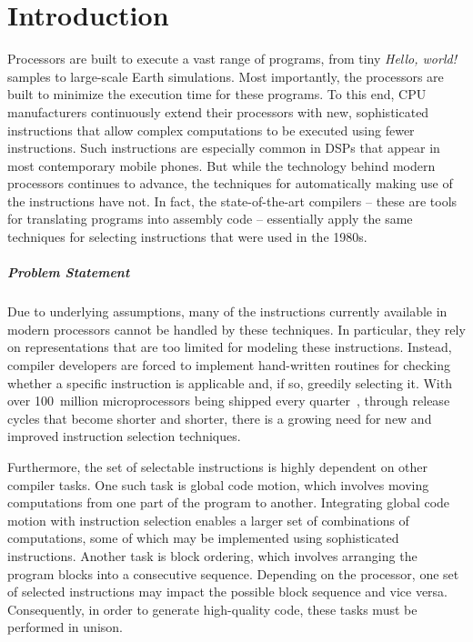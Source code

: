 %

\chapter{Introduction}

\enlargethispage{3pt}

Processors are built to execute a vast range of \glspl{program}, from tiny
\emph{Hello, world!} samples to large-scale Earth simulations.
%
Most importantly, the processors are built to minimize the execution time for
these \glspl{program}.
%
To this end, CPU manufacturers continuously extend their processors with new,
sophisticated \glspl{instruction} that allow complex computations to be executed
using fewer \glspl{instruction}.
%
Such \glspl{instruction} are especially common in \glspl{DSP} that appear in
most contemporary mobile phones.
%
But while the technology behind modern processors continues to advance, the
techniques for automatically making use of the \glspl{instruction} have not.
%
In fact, the state-of-the-art \glspl{compiler} -- these are tools for
translating \glspl{program} into \gls{assembly code} -- essentially apply the
same techniques for selecting \glspl{instruction} that were used in the 1980s.


\paragraph{Problem Statement}

Due to underlying assumptions, many of the \glspl{instruction} currently
available in modern processors cannot be handled by these techniques.
%
In particular, they rely on representations that are too limited for modeling
these \glspl{instruction}.
%
Instead, \gls{compiler} developers are forced to implement hand-written routines
for checking whether a specific \gls{instruction} is applicable and, if so,
greedily selecting it.
%
With over \num{100}~million microprocessors being shipped every
quarter~\cite{Intel:2014:NewsRelease}, through release cycles that become
shorter and shorter, there is a growing need for new and improved
\gls{instruction selection} techniques.

Furthermore, the set of selectable \glspl{instruction} is highly dependent on
other \gls{compiler} tasks.
%
One such task is \gls{global code motion}, which involves moving computations
from one part of the \gls{program} to another.
%
Integrating \gls{global code motion} with \gls{instruction selection} enables a
larger set of combinations of computations, some of which may be implemented
using sophisticated \glspl{instruction}.
%
Another task is \gls{block ordering}, which involves arranging the \gls{program}
\glspl{block} into a consecutive sequence.
%
Depending on the processor, one set of selected \glspl{instruction} may impact
the possible \gls{block} sequence and vice versa.
%
Consequently, in order to generate high-quality code, these tasks must be
performed in unison.


